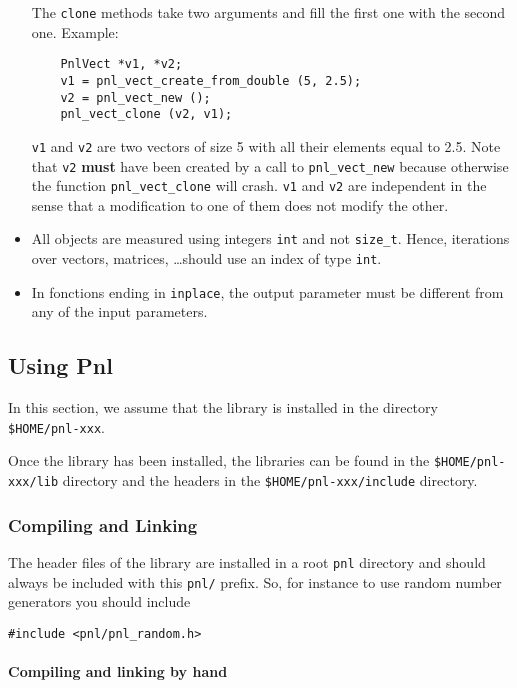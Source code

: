 \documentclass[a4paper,11pt,twoside]{article}
\begin{document}
\begin{itemize}
    The \verb!clone! methods take two arguments and fill the first one with the
    second one. 
    Example:
    \begin{verbatim}
    PnlVect *v1, *v2;
    v1 = pnl_vect_create_from_double (5, 2.5);
    v2 = pnl_vect_new ();
    pnl_vect_clone (v2, v1);
    \end{verbatim}
    \verb!v1! and \verb!v2! are two vectors of size 5 with all their elements
    equal to 2.5. Note that \verb!v2! {\bf must} have been created by a call to
    \verb!pnl_vect_new! because otherwise the function
    \verb!pnl_vect_clone!  will crash.  \verb!v1! and \verb!v2! are independent
    in the sense that a modification to one of them does not modify the other.


  \item All objects are measured using integers \verb!int! and not
    \verb!size_t!. Hence, iterations over vectors, matrices, \dots should use an
    index of type \verb!int!.

  \item In fonctions ending in \verb!inplace!, the output parameter must be different
    from any of the input parameters.
\end{itemize}


\subsection{Using Pnl}

In this section, we assume that the library is installed in the directory
\verb!$HOME/pnl-xxx!.

Once the library has been installed, the libraries can be found in the
\verb!$HOME/pnl-xxx/lib!  directory and the headers in the
\verb!$HOME/pnl-xxx/include! directory. 

\subsubsection{Compiling and Linking}

The header files of the library are installed in a root \verb!pnl! directory and
should always be included with this \verb!pnl/! prefix. So, for instance to use
random number generators you should include 
\begin{verbatim}
#include <pnl/pnl_random.h>
\end{verbatim}

\paragraph{Compiling and linking by hand}
\end{document}
